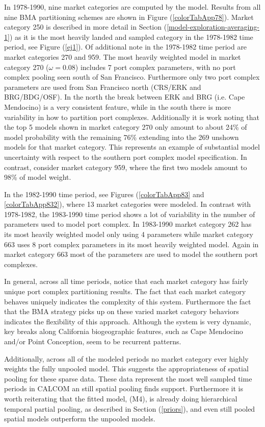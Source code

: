 \documentclass[12pt]{article}
\begin{document}
In 1978-1990, nine market categories are computed by the model. Results from all 
nine BMA partitioning schemes are shown in Figure (\ref{colorTabApp78}). Market 
category 250 is described in more detail in Section (\ref{model-exploration-averaging-1}) 
as it is the most heavily landed and sampled category in the 1978-1982 time 
period, see Figure (\ref{ej1}). Of additional note in the 1978-1982 time period 
are market categories 270 and 959. The most heavily weighted model in market 
category 270 ($\omega=0.08$) includes 7 port complex parameters, with no port 
complex pooling seen south of San Francisco. Furthermore only two port complex 
parameters are used from San Francisco north (CRS/ERK and BRG/BDG/OSF). In the 
north the break between ERK and BRG (i.e. Cape Mendocino) is a very consistent 
feature, while in the south there is more variability in how to partition port 
complexes. Additionally it is work noting that the top 5 models shown in market 
category 270 only amount to about 24\% of model probability with the remaining 
76\% extending into the 269 unshown models for that market category. This 
represents an example of substantial model uncertainty with respect to the 
southern port complex model specification. In contrast, consider market category 
959, where the first two models amount to 98\% of model weight.

In the 1982-1990 time period, see 
Figures (\ref{colorTabApp83} and \ref{colorTabApp832}), where 13 market 
categories were modeled. In contrast with 1978-1982, the 1983-1990 time period 
shows a lot of variability in the number of parameters used to model port 
complex. In 1983-1990 market category 262 has its most heavily weighted model 
only using 4 parameters while market category 663 uses 8 port complex 
parameters in its most heavily weighted model. Again in market category 663 
most of the parameters are used to model the southern port complexes. 
  
In general, across all time periods, notice that each market category has 
fairly unique port complex partitioning results. The fact that each market 
category behaves uniquely indicates the complexity of this system. Furthermore 
the fact that the BMA strategy picks up on these varied market category 
behaviors indicates the flexibility of this approach. Although the system is 
very dynamic, key breaks along California biogeographic features, such as Cape 
Mendocino and/or Point Conception, seem to be recurrent patterns. 

Additionally, across all of the modeled periods no market category ever highly 
weights the fully unpooled model. This suggests the appropriateness of spatial 
pooling for these sparse data. These data represent the most well sampled time 
periods in CALCOM an still spatial pooling finds support. Furthermore it is 
worth reiterating that the fitted model, (M4), is already doing hierarchical 
temporal partial pooling, as described in Section (\ref{priors}), and even 
still pooled spatial models outperform the unpooled models.
\end{document}
